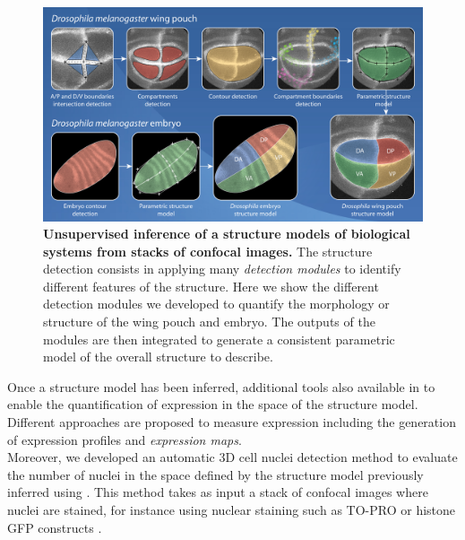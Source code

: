 \begin{figure}[!h]
\centering
\includegraphics[width=146mm]{images/generic-diagram_300dpi.jpg} %
\caption{\textbf{Unsupervised inference of a structure models of biological systems from stacks of confocal images.} The structure detection consists in applying many \textit{detection modules} to identify different features of the structure. Here we show the different detection modules we developed to quantify the morphology or structure of the \droso wing pouch and \droso embryo. The outputs of the modules are then integrated to generate a consistent parametric model of the overall structure to describe.}
\label{fig:detection_modules_overview}
\end{figure}

Once a structure model has been inferred, additional tools also available in \wingj to enable the quantification of expression in the space of the structure model. Different approaches are proposed to measure expression including the generation of expression profiles and \textit{expression maps}.\\

Moreover, we developed an automatic 3D cell nuclei detection method to evaluate the number of nuclei in the space defined by the structure model previously inferred using \wingj. This method takes as input a stack of confocal images where nuclei are stained, for instance using nuclear staining such as TO-PRO \autocite{suzuki1997dna} or histone GFP constructs \autocite{kanda1998histone}.\\



